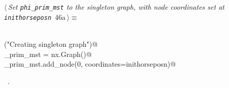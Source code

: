 \documentclass[11.5pt]{report}
\begin{document}
\begin{flushleft} \small
\begin{minipage}{\linewidth}\label{scrap54}\raggedright\small
{} $\langle\,${\itshape Set \verb|phi_prim_mst| to the singleton graph, with node coordinates set at \verb|inithorseposn|}\nobreak\ {\footnotesize {46a}}$\,\rangle\equiv$
\vspace{-1ex}
\begin{list}{}{} \item
\mbox{}\verb@@\\
\mbox{}\verb@info("Creating singleton graph")@\\
\mbox{}\verb@phi_prim_mst = nx.Graph()@\\
\mbox{}\verb@phi_prim_mst.add_node(0, coordinates=inithorseposn)@\\
\mbox{}\verb@@{\NWsep}
\end{list}
\vspace{-1.5ex}
\footnotesize
\begin{list}{}{\setlength{\itemsep}{-\parsep}\setlength{\itemindent}{-\leftmargin}}
\item \NWtxtMacroRefIn\ .

\item{}
\end{list}
\end{minipage}\vspace{4ex}
\end{flushleft}
\vspace{-0.8cm}\newchunk
\end{document}
